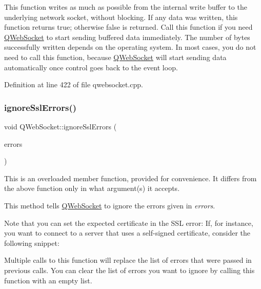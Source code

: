 This function writes as much as possible from the internal write buffer to the underlying network socket, without blocking. If any data was written, this function returns true; otherwise false is returned. Call this function if you need \mbox{\hyperlink{class_q_web_socket}{Q\+Web\+Socket}} to start sending buffered data immediately. The number of bytes successfully written depends on the operating system. In most cases, you do not need to call this function, because \mbox{\hyperlink{class_q_web_socket}{Q\+Web\+Socket}} will start sending data automatically once control goes back to the event loop. 

Definition at line 422 of file qwebsocket.\+cpp.

\mbox{\label{class_q_web_socket_ae3c765afbdc0e0afad03b8ad8c958fab}} 
\subsubsection{\texorpdfstring{ignore\+Ssl\+Errors()}{ignoreSslErrors()}\hspace{0.1cm}{\footnotesize\ttfamily [1/2]}}
{\footnotesize\ttfamily void Q\+Web\+Socket\+::ignore\+Ssl\+Errors (\begin{DoxyParamCaption}\item[{const Q\+List$<$ Q\+Ssl\+Error $>$ \&}]{errors }\end{DoxyParamCaption})}

This is an overloaded member function, provided for convenience. It differs from the above function only in what argument(s) it accepts.

This method tells \mbox{\hyperlink{class_q_web_socket}{Q\+Web\+Socket}} to ignore the errors given in {\itshape errors}.

Note that you can set the expected certificate in the S\+SL error\+: If, for instance, you want to connect to a server that uses a self-\/signed certificate, consider the following snippet\+:


\begin{DoxyCodeInclude}
\end{DoxyCodeInclude}
 Multiple calls to this function will replace the list of errors that were passed in previous calls. You can clear the list of errors you want to ignore by calling this function with an empty list.

